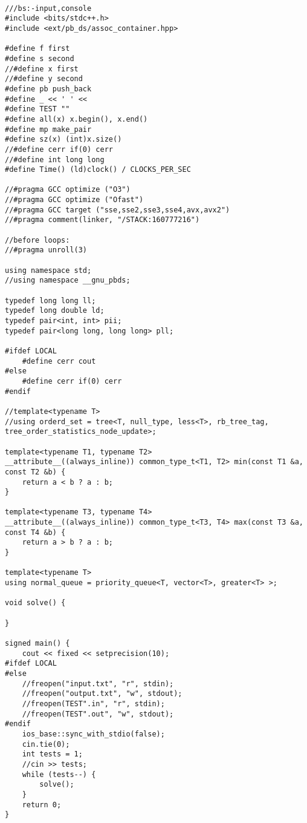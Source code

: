 \documentclass{article}
\begin{document}
    \begin{verbatim}
        
///bs:-input,console
#include <bits/stdc++.h>
#include <ext/pb_ds/assoc_container.hpp>

#define f first
#define s second
//#define x first
//#define y second
#define pb push_back
#define _ << ' ' <<
#define TEST ""
#define all(x) x.begin(), x.end()
#define mp make_pair
#define sz(x) (int)x.size()
//#define cerr if(0) cerr
//#define int long long
#define Time() (ld)clock() / CLOCKS_PER_SEC

//#pragma GCC optimize ("O3")
//#pragma GCC optimize ("Ofast")
//#pragma GCC target ("sse,sse2,sse3,sse4,avx,avx2")
//#pragma comment(linker, "/STACK:160777216")

//before loops:
//#pragma unroll(3)

using namespace std;
//using namespace __gnu_pbds;

typedef long long ll;
typedef long double ld;
typedef pair<int, int> pii;
typedef pair<long long, long long> pll;

#ifdef LOCAL
    #define cerr cout
#else
    #define cerr if(0) cerr
#endif

//template<typename T>
//using orderd_set = tree<T, null_type, less<T>, rb_tree_tag, tree_order_statistics_node_update>;

template<typename T1, typename T2>
__attribute__((always_inline)) common_type_t<T1, T2> min(const T1 &a, const T2 &b) {
    return a < b ? a : b;
}

template<typename T3, typename T4>
__attribute__((always_inline)) common_type_t<T3, T4> max(const T3 &a, const T4 &b) {
    return a > b ? a : b;
}

template<typename T>
using normal_queue = priority_queue<T, vector<T>, greater<T> >;

void solve() {
    
}

signed main() {
    cout << fixed << setprecision(10);
#ifdef LOCAL
#else
    //freopen("input.txt", "r", stdin);
    //freopen("output.txt", "w", stdout);
    //freopen(TEST".in", "r", stdin);
    //freopen(TEST".out", "w", stdout);
#endif
    ios_base::sync_with_stdio(false);
    cin.tie(0);
    int tests = 1;
    //cin >> tests;
    while (tests--) {
        solve();
    }
    return 0;
}
        
    \end{verbatim}
\end{document}
